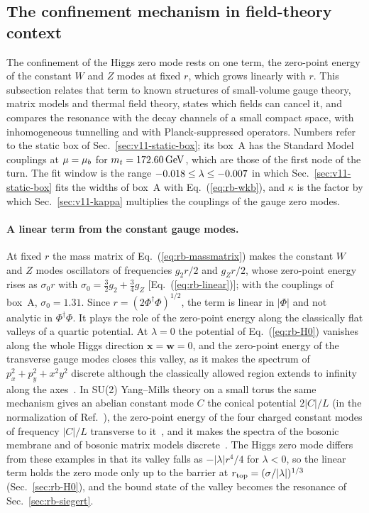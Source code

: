 \subsection{The confinement mechanism in field-theory context}
\label{sec:v11-mechanism-context}

The confinement of the Higgs zero mode rests on one term, the zero-point energy of the constant $W$ and $Z$ modes at fixed $r$, which grows linearly with $r$.
This subsection relates that term to known structures of small-volume gauge theory, matrix models and thermal field theory, states which fields can cancel it, and compares the resonance with the decay channels of a small compact space, with inhomogeneous tunnelling and with Planck-suppressed operators.
Numbers refer to the static box of Sec.~\ref{sec:v11-static-box}; its box~A has the Standard Model couplings at $\mu=\mu_b$ for $m_t=172.60\,\mathrm{GeV}$, which are those of the first node of the turn. %
The fit window is the range $-0.018\le\lambda\le-0.007$ in which Sec.~\ref{sec:v11-static-box} fits the widths of box~A with Eq.~(\ref{eq:rb-wkb}), and $\kappa$ is the factor by which Sec.~\ref{sec:v11-kappa} multiplies the couplings of the gauge zero modes. %

\paragraph{A linear term from the constant gauge modes.}
At fixed $r$ the mass matrix of Eq.~(\ref{eq:rb-massmatrix}) makes the constant $W$ and $Z$ modes oscillators of frequencies $g_2r/2$ and $g_Zr/2$, whose zero-point energy rises as $\sigma_0r$ with $\sigma_0=\frac32g_2+\frac34g_Z$ [Eq.~(\ref{eq:rb-linear})]; with the couplings of box~A, $\sigma_0=1.31$. %
Since $r=(2\Phi^\dagger\Phi)^{1/2}$, the term is linear in $|\Phi|$ and not analytic in $\Phi^\dagger\Phi$.
It plays the role of the zero-point energy along the classically flat valleys of a quartic potential.
At $\lambda=0$ the potential of Eq.~(\ref{eq:rb-H0}) vanishes along the whole Higgs direction $\bm x=\bm w=0$, and the zero-point energy of the transverse gauge modes closes this valley, as it makes the spectrum of $p_x^2+p_y^2+x^2y^2$ discrete although the classically allowed region extends to infinity along the axes~\cite{Simon:1983jy}.
In SU(2) Yang--Mills theory on a small torus the same mechanism gives an abelian constant mode $C$ the conical potential $2|C|/L$ (in the normalization of Ref.~\cite{vanBaal:2000zc}), the zero-point energy of the four charged constant modes of frequency $|C|/L$ transverse to it~\cite{vanBaal:2000zc,Barbon:2005zj}, and it makes the spectra of the bosonic membrane and of bosonic matrix models discrete~\cite{deWit:1988xki,Barbon:2005zj}. %
The Higgs zero mode differs from these examples in that its valley falls as $-|\lambda|r^4/4$ for $\lambda<0$, so the linear term holds the zero mode only up to the barrier at $r_{\rm top}=(\sigma/|\lambda|)^{1/3}$ (Sec.~\ref{sec:rb-H0}), and the bound state of the valley becomes the resonance of Sec.~\ref{sec:rb-siegert}.

